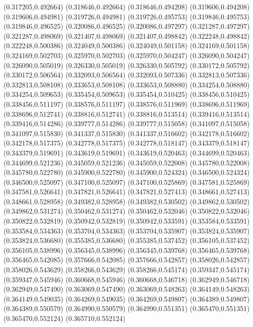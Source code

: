 (0.317205,0.492664)
(0.318646,0.492664)
(0.318646,0.494208)
(0.319606,0.494208)
(0.319606,0.494981)
(0.319726,0.494981)
(0.319726,0.495753)
(0.319846,0.495753)
(0.319846,0.496525)
(0.320086,0.496525)
(0.320086,0.497297)
(0.321287,0.497297)
(0.321287,0.498069)
(0.321407,0.498069)
(0.321407,0.498842)
(0.322248,0.498842)
(0.322248,0.500386)
(0.324049,0.500386)
(0.324049,0.501158)
(0.324169,0.501158)
(0.324169,0.502703)
(0.325970,0.502703)
(0.325970,0.504247)
(0.326090,0.504247)
(0.326090,0.505019)
(0.326330,0.505019)
(0.326330,0.505792)
(0.330172,0.505792)
(0.330172,0.506564)
(0.332093,0.506564)
(0.332093,0.507336)
(0.332813,0.507336)
(0.332813,0.508108)
(0.333653,0.508108)
(0.333653,0.508880)
(0.334254,0.508880)
(0.334254,0.509653)
(0.335454,0.509653)
(0.335454,0.510425)
(0.338456,0.510425)
(0.338456,0.511197)
(0.338576,0.511197)
(0.338576,0.511969)
(0.338696,0.511969)
(0.338696,0.512741)
(0.338816,0.512741)
(0.338816,0.513514)
(0.339416,0.513514)
(0.339416,0.514286)
(0.339777,0.514286)
(0.339777,0.515058)
(0.341097,0.515058)
(0.341097,0.515830)
(0.341337,0.515830)
(0.341337,0.516602)
(0.342178,0.516602)
(0.342178,0.517375)
(0.342778,0.517375)
(0.342778,0.518147)
(0.343379,0.518147)
(0.343379,0.519691)
(0.343619,0.519691)
(0.343619,0.520463)
(0.344699,0.520463)
(0.344699,0.521236)
(0.345059,0.521236)
(0.345059,0.522008)
(0.345780,0.522008)
(0.345780,0.522780)
(0.345900,0.522780)
(0.345900,0.524324)
(0.346500,0.524324)
(0.346500,0.525097)
(0.347100,0.525097)
(0.347100,0.525869)
(0.347581,0.525869)
(0.347581,0.526641)
(0.347821,0.526641)
(0.347821,0.527413)
(0.348661,0.527413)
(0.348661,0.528958)
(0.349382,0.528958)
(0.349382,0.530502)
(0.349862,0.530502)
(0.349862,0.531274)
(0.350462,0.531274)
(0.350462,0.532046)
(0.350822,0.532046)
(0.350822,0.532819)
(0.350942,0.532819)
(0.350942,0.533591)
(0.353584,0.533591)
(0.353584,0.534363)
(0.353704,0.534363)
(0.353704,0.535907)
(0.353824,0.535907)
(0.353824,0.536680)
(0.355385,0.536680)
(0.355385,0.537452)
(0.356105,0.537452)
(0.356105,0.538996)
(0.356345,0.538996)
(0.356345,0.539768)
(0.356465,0.539768)
(0.356465,0.542085)
(0.357666,0.542085)
(0.357666,0.542857)
(0.358026,0.542857)
(0.358026,0.543629)
(0.358266,0.543629)
(0.358266,0.545174)
(0.359347,0.545174)
(0.359347,0.545946)
(0.360668,0.545946)
(0.360668,0.546718)
(0.362949,0.546718)
(0.362949,0.547490)
(0.363069,0.547490)
(0.363069,0.548263)
(0.364149,0.548263)
(0.364149,0.549035)
(0.364269,0.549035)
(0.364269,0.549807)
(0.364389,0.549807)
(0.364389,0.550579)
(0.364990,0.550579)
(0.364990,0.551351)
(0.365470,0.551351)
(0.365470,0.552124)
(0.365710,0.552124)
